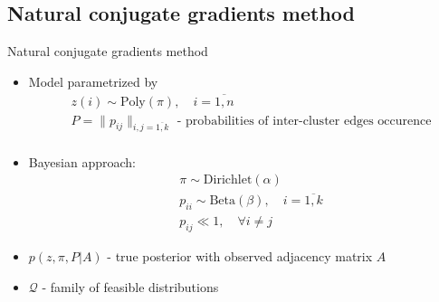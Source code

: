 \documentclass{beamer}
\theoremstyle{definition}
\theoremstyle{plain}
\theoremstyle{remark}
\begin{document}
        \subsection{Natural conjugate gradients method}
			\begin{frame}{Natural conjugate gradients method} %
                \begin{itemize}
                    \item Model parametrized by
                        \begin{equation}
                            \begin{aligned}
                            \nonumber
                                & z(i) \sim \text{Poly}(\pi), \quad i=\overline{1, n} \\
                                & P = \| p_{ij} \|_{i,j=\overline{1,k}} \text{ - probabilities of inter-cluster edges occurence} \\
                            \end{aligned}
                        \end{equation}
                
                    \item Bayesian approach:
                    \begin{equation}
                        \begin{aligned}
                        \nonumber
                            & \pi \sim \text{Dirichlet}(\alpha) \\
                            & p_{ii} \sim \text{Beta}(\beta), \quad i = \overline{1,k} \\
                            & p_{ij} \ll 1, \quad \forall i\neq j
                        \end{aligned}
                    \end{equation}
                    \item $p(z, \pi, P | A)$ - true posterior with observed adjacency matrix $A$
                    \item $\mathcal Q$ - family of feasible distributions            
                \end{itemize}

			\end{frame}
\end{document}
